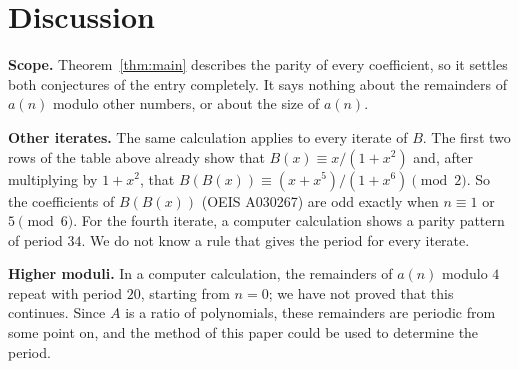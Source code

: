 \documentclass[11pt,a4paper]{article}
\theoremstyle{definition}
\theoremstyle{remark}
\newcommand{\para}[1]{\par\medskip\noindent\textbf{#1}\enspace}
\begin{document}
\section{Discussion}\label{sec:discussion}

\para{Scope.} Theorem~\ref{thm:main} describes the parity of every coefficient, so it settles both conjectures of the
entry completely. It says nothing about the remainders of $a(n)$ modulo other numbers, or about the size of $a(n)$.

\para{Other iterates.} The same calculation applies to every iterate of $B$. The first two rows of the table above
already show that $B(x)\equiv x/(1+x^2)$ and, after multiplying by $1+x^2$, that
$B(B(x))\equiv(x+x^5)/(1+x^6)\pmod2$. So the coefficients of $B(B(x))$ (OEIS A030267) are odd exactly when
$n\equiv1$ or $5\pmod 6$. For the fourth iterate, a computer calculation shows a parity pattern of period $34$. We do not
know a rule that gives the period for every iterate.

\para{Higher moduli.} In a computer calculation, the remainders of $a(n)$ modulo $4$ repeat with period $20$,
starting from $n=0$; we have not proved that this continues. Since $A$ is a ratio of polynomials, these remainders are
periodic from some point on, and the method of this paper could be used to determine the period.
\end{document}
